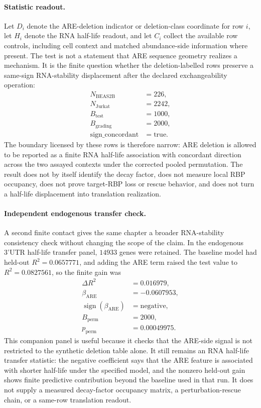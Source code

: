 \paragraph{Statistic readout.}
Let $D_i$ denote the ARE-deletion indicator or deletion-class coordinate for row $i$, let $H_i$ denote the RNA half-life readout, and let $C_i$ collect the available row controls, including cell context and matched abundance-side information where present.  The test is not a statement that ARE sequence geometry realizes a mechanism.  It is the finite question whether the deletion-labelled rows preserve a same-sign RNA-stability displacement after the declared exchangeability operation:
$$
\begin{aligned}
N_{\mathrm{BEAS2B}} &= 226, \\
N_{\mathrm{Jurkat}} &= 2242, \\
B_{\mathrm{test}} &= 1000, \\
B_{\mathrm{grading}} &= 2000, \\
\mathrm{sign\_concordant} &= \mathrm{true}.
\end{aligned}
$$
The boundary licensed by these rows is therefore narrow: ARE deletion is allowed to be reported as a finite RNA half-life association with concordant direction across the two assayed contexts under the corrected pooled permutation.  The result does not by itself identify the decay factor, does not measure local RBP occupancy, does not prove target-RBP loss or rescue behavior, and does not turn a half-life displacement into translation realization.

\paragraph{Independent endogenous transfer check.}
A second finite contact gives the same chapter a broader RNA-stability consistency check without changing the scope of the claim.  In the endogenous 3'UTR half-life transfer panel, $14933$ genes were retained.  The baseline model had held-out $R^2=0.0657771$, and adding the ARE term raised the test value to $R^2=0.0827561$, so the finite gain was
$$
\begin{aligned}
\Delta R^2 &= 0.016979, \\
\beta_{\mathrm{ARE}} &= -0.0607953, \\
\operatorname{sign}(\beta_{\mathrm{ARE}}) &= \mathrm{negative}, \\
B_{\mathrm{perm}} &= 2000, \\
p_{\mathrm{perm}} &= 0.00049975.
\end{aligned}
$$
This companion panel is useful because it checks that the ARE-side signal is not restricted to the synthetic deletion table alone.  It still remains an RNA half-life transfer statistic: the negative coefficient says that the ARE feature is associated with shorter half-life under the specified model, and the nonzero held-out gain shows finite predictive contribution beyond the baseline used in that run.  It does not supply a measured decay-factor occupancy matrix, a perturbation-rescue chain, or a same-row translation readout.

